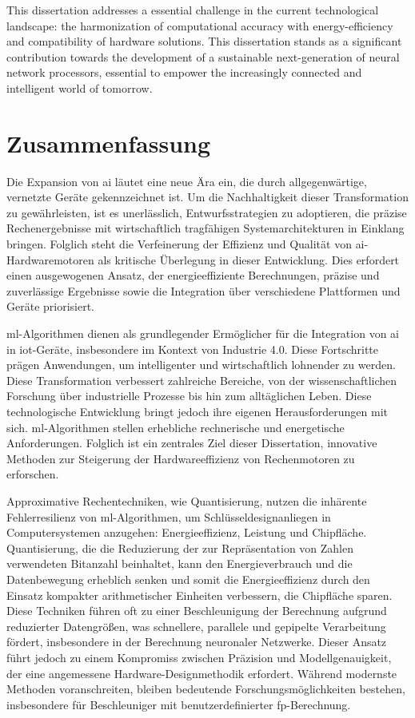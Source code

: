 This dissertation addresses a essential challenge in the current technological landscape: the harmonization of computational accuracy with energy-efficiency and compatibility of hardware solutions. This dissertation stands as a significant contribution towards the development of a sustainable next-generation of neural network processors, essential to empower the increasingly connected and intelligent world of tomorrow.

\chapter*{Zusammenfassung}
\thispagestyle{empty}

Die Expansion von \gls{ai} l\"autet eine neue \"Ara ein, die durch allgegenw\"artige, vernetzte Ger\"ate gekennzeichnet ist. Um die Nachhaltigkeit dieser Transformation zu gew\"ahrleisten, ist es unerl\"asslich, Entwurfsstrategien zu adoptieren, die pr\"azise Rechenergebnisse mit wirtschaftlich tragf\"ahigen Systemarchitekturen in Einklang bringen. Folglich steht die Verfeinerung der Effizienz und Qualit\"at von \gls{ai}-Hardwaremotoren als kritische \"Uberlegung in dieser Entwicklung. Dies erfordert einen ausgewogenen Ansatz, der energieeffiziente Berechnungen, pr\"azise und zuverl\"assige Ergebnisse sowie die Integration \"uber verschiedene Plattformen und Ger\"ate priorisiert.

\gls{ml}-Algorithmen dienen als grundlegender Erm\"oglicher f\"ur die Integration von \gls{ai} in \gls{iot}-Ger\"ate, insbesondere im Kontext von Industrie 4.0. Diese Fortschritte pr\"agen Anwendungen, um intelligenter und wirtschaftlich lohnender zu werden. Diese Transformation verbessert zahlreiche Bereiche, von der wissenschaftlichen Forschung \"uber industrielle Prozesse bis hin zum allt\"aglichen Leben. Diese technologische Entwicklung bringt jedoch ihre eigenen Herausforderungen mit sich. \gls{ml}-Algorithmen stellen erhebliche rechnerische und energetische Anforderungen. Folglich ist ein zentrales Ziel dieser Dissertation, innovative Methoden zur Steigerung der Hardwareeffizienz von Rechenmotoren zu erforschen.

Approximative Rechentechniken, wie Quantisierung, nutzen die inh\"arente Fehlerresilienz von \gls{ml}-Algorithmen, um Schl\"usseldesignanliegen in Computersystemen anzugehen: Energieeffizienz, Leistung und Chipfl\"ache. Quantisierung, die die Reduzierung der zur Repr\"asentation von Zahlen verwendeten Bitanzahl beinhaltet, kann den Energieverbrauch und die Datenbewegung erheblich senken und somit die Energieeffizienz durch den Einsatz kompakter arithmetischer Einheiten verbessern, die Chipfl\"ache sparen. Diese Techniken f\"uhren oft zu einer Beschleunigung der Berechnung aufgrund reduzierter Datengr\"o\ss{}en, was schnellere, parallele und gepipelte Verarbeitung f\"ordert, insbesondere in der Berechnung neuronaler Netzwerke. Dieser Ansatz f\"uhrt jedoch zu einem Kompromiss zwischen Pr\"azision und Modellgenauigkeit, der eine angemessene Hardware-Designmethodik erfordert. W\"ahrend modernste Methoden voranschreiten, bleiben bedeutende Forschungsm\"oglichkeiten bestehen, insbesondere f\"ur Beschleuniger mit benutzerdefinierter \gls{fp}-Berechnung.


